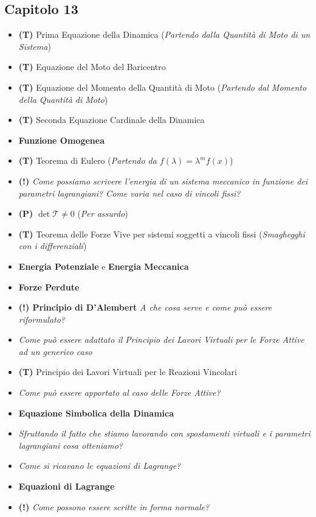 \documentclass[11pt,a4paper,twoside]{article}
\begin{document}
\subsection*{Capitolo 13}

\begin{itemize}
	\item \textbf{(T)} Prima Equazione della Dinamica (\textit{Partendo dalla Quantità di Moto di un Sistema})
	\item \textbf{(T)} Equazione del Moto del Baricentro
	\item \textbf{(T)} Equazione del Momento della Quantità di Moto (\textit{Partendo dal Momento della Quantità di Moto})
	\item \textbf{(T)} Seconda Equazione Cardinale della Dinamica
	\item \textbf{Funzione Omogenea}
	\item \textbf{(T)} Teorema di Eulero (\textit{Partendo da $f(\lambda)= \lambda^m f(x)$})
	\item \textbf{(!)} \textit{Come possiamo scrivere l'energia di un sistema meccanico in funzione dei parametri lagrangiani? Come varia nel caso di vincoli fissi?}
	\item \textbf{(P)} $\det \mathscr T \neq 0$ (\textit{Per assurdo})
	\item \textbf{(T)} Teorema delle Forze Vive per sistemi soggetti a vincoli fissi (\textit{Smaghegghi con i differenziali})
	\item \textbf{Energia Potenziale} e \textbf{Energia Meccanica}
	\item \textbf{Forze Perdute}
	\item \textbf{(!) Principio di D'Alembert} \textit{A che cosa serve e come può essere riformulato?}
	\item \textit{Come può essere adattato il Principio dei Lavori Virtuali per le Forze Attive ad un generico caso}
	\item \textbf{(T)} Principio dei Lavori Virtuali per le Reazioni Vincolari
	\item \textit{Come può essere apportato al caso delle Forze Attive?}
	\item \textbf{Equazione Simbolica della Dinamica}
	\item \textit{Sfruttando il fatto che stiamo lavorando con spostamenti virtuali e i parametri lagrangiani cosa otteniamo?}
	\item \textit{Come si ricavano le equazioni di Lagrange?}
	\item \textbf{Equazioni di Lagrange}
	\item \textbf{(!)} \textit{Come possono essere scritte in forma normale?}

\end{itemize}
\end{document}
